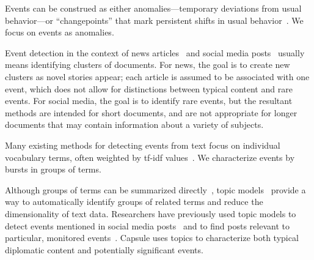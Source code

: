 Events can be construed as either anomalies---temporary deviations
from usual behavior---or ``changepoints'' that mark persistent shifts
in usual behavior~\cite{guralnik1999event,adams2007bayesian}. We focus
on events as anomalies.


Event detection in the context of news
articles~\cite{zhao2012novel,zhao2007temporal,zhang2002novelty,li2005probabilistic,wang2007mining,allan1998line}
and social media
posts~\cite{atefeh2015survey,VanDam:2012,lau2012line,jackoway2011identification,sakaki2010earthquake,reuter2012event,becker2010learning,sayyadi2009event}
usually means identifying clusters of documents. For news, the goal is
to create new clusters as novel stories appear; each article is assumed
to be associated with one event, which does not allow for distinctions
between typical content and rare events.
For social media, the goal is
to identify rare events, but the resultant methods are intended for
short documents, and are not appropriate for longer documents that may
contain information about a variety of subjects.

Many existing methods for detecting events from text focus on
individual vocabulary terms, often weighted by tf-idf
values~\cite{fung2005parameter,kumaran2004text,brants2003system,das2011dynamic,zhao2007temporal,zhao2012novel}.
We characterize events by bursts in groups of terms.

Although groups of terms can be summarized
directly~\cite{peng2007event,chakrabarti2011event,gao2012joint}, topic
models~\cite{Blei:2012} provide a way to automatically identify groups
of related terms and reduce the dimensionality of text
data. Researchers have previously used topic models to detect events
mentioned in social media posts~\cite{lau2012line,dou2012leadline} and
to find posts relevant to particular, monitored
events~\cite{VanDam:2012}. Capsule uses topics to characterize both
typical diplomatic content and potentially significant events.

